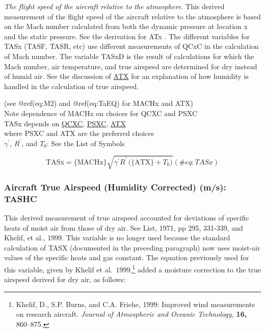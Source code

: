 \documentclass[
  english,
]{book}
\begin{document}
\emph{The flight speed of the aircraft relative to the atmosphere.} This
derived measurement of the flight speed of the aircraft relative to the
atmosphere is based on the Mach number calculated from both the dynamic
pressure at location x and the static pressure. See the derivation for
ATx . The different variables for TASx (TASF, TASR, etc) use different
measurements of QCxC in the calculation of Mach number. The variable
TASxD is the result of calculations for which the Mach number, air
temperature, and true airspeed are determined for dry instead of humid
air. See the discussion of \protect\hyperlink{ATX}{ATX} for an
explanation of how humidity is handled in the calculation of true
airspeed.

(see @ref(eq:M2) and @ref(eq:TaEQ) for MACHx and ATX)\\
Note dependence of MACHx on choices for QCXC and PSXC\\
TASx depends on \protect\hyperlink{qcx}{QCXC},
\protect\hyperlink{psx}{PSXC}, \href{ambient-t}{ATX}\\
\hspace*{0.333em}\hspace*{0.333em}\hspace*{0.333em}\hspace*{0.333em}\hspace*{0.333em}where
PSXC and ATX are the preferred choices\\
\(\gamma^{\prime}\), \(R^{\prime}\), and \(T_{0}\): See the List of
Symbols

\begin{equation}
\mathrm{TASx}=\mathrm{\{MACHx\}}\sqrt{\gamma^{\prime}R^{\prime}\mathrm{\,(\{ATX\}}+T_{0})}
(\#eq:TASx)
\end{equation}

\hypertarget{tashc}{%
\subsubsection*{Aircraft True Airspeed (Humidity Corrected) (m/s):
TASHC}\label{tashc}}

This derived measurement of true airspeed accounted for deviations of
specific heats of moist air from those of dry air. See List, 1971, pp
295, 331-339, and Khelif, et al., 1999. This variable is no longer used
because the standard calculation of TASX (documented in the preceding
paragraph) now uses moist-air values of the specific heats and gas
constant. The equation previously used for this variable, given by
Khelif et al.~1999,\footnote{Khelif, D., S.P. Burns, and C.A. Friehe,
  1999: Improved wind measurements on research aircraft. \emph{Journal
  of Atmospheric and Oceanic Technology,} \textbf{16,} 860--875.} added
a moisture correction to the true airspeed derived for dry air, as
follows:
\end{document}
